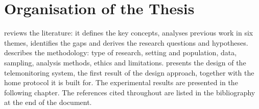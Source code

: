 \section{Organisation of the Thesis}\label{sec:intro-organisation}

 reviews the literature: it defines the key concepts, analyses previous work in six themes, identifies the gaps and derives the research questions and hypotheses.  describes the methodology: type of research, setting and population, data, sampling, analysis methods, ethics and limitations.  presents the design of the telemonitoring system, the first result of the design approach, together with the home protocol it is built for. The experimental results are presented in the following chapter. The references cited throughout are listed in the bibliography at the end of the document.

